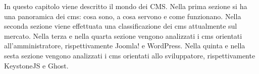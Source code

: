 In questo capitolo viene descritto il mondo dei CMS. Nella prima sezione si ha una panoramica dei cms: cosa sono, a cosa servono e come funzionano. Nella seconda sezione viene effettuata una classificazione dei cms attualmente sul mercato. Nella terza e nella quarta sezione vengono analizzati i cms orientati all'amministratore, rispettivamente Joomla! e WordPress. Nella quinta e nella sesta sezione vengono analizzati i cms orientati allo sviluppatore, rispettivamente KeystoneJS e Ghost.